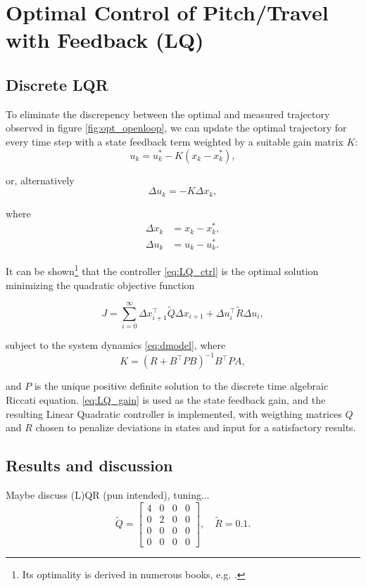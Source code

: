 \section{Optimal Control of Pitch/Travel with Feedback (LQ)}\label{sec:prob3}
\label{text:problem3}

\subsection{Discrete LQR}
\label{text:LQR}

To eliminate the discrepency between the optimal and measured trajectory observed in figure \ref{fig:opt_openloop}, we can update the optimal trajectory for every time step with a state feedback term weighted by a suitable gain matrix $K$:
\begin{equation*}
u_k = u_k^* - K (x_k - x_k^*),
\end{equation*}

or, alternatively
\begin{equation}
\label{eq:LQ_ctrl}
\Delta u_k = - K \Delta x_k,
\end{equation}

where 
\begin{align*}
\Delta x_k &= x_k - x_k^*,\\
\Delta u_k &= u_k - u_k^*.
\end{align*}

It can be shown\footnote{Its optimality is derived in numerous books, e.g. \cite{Kwakernaak1972}.} that the controller \eqref{eq:LQ_ctrl} is the optimal solution minimizing the quadratic objective function

\begin{equation*}
	J = \sum_{i=0}^{\infty} \Delta x_{i+1}^\top \tilde{Q} \Delta x_{i+1} + \Delta u_i^\top \tilde{R} \Delta u_i,
\end{equation*}

subject to the system dynamics \eqref{eq:dmodel}, where
\begin{equation}
\label{eq:LQ_gain}
	K = (R + B^\top P B)^{-1} B^\top P A,
\end{equation}

and $P$ is the unique positive definite solution to the discrete time algebraic Riccati equation. \eqref{eq:LQ_gain} is used as the state feedback gain, and the resulting Linear Quadratic controller is implemented, with weigthing matrices $Q$ and $R$ chosen to penalize deviations in states and input for a satisfactory results.

\subsection{Results and discussion}
Maybe discuss (L)QR (pun intended), tuning...
\begin{equation*}
\tilde{Q} = \begin{bmatrix}4&0&0&0\\0&2&0&0\\0&0&0&0\\0&0&0&0\end{bmatrix}, \quad \tilde{R} = 0.1.
\end{equation*}

